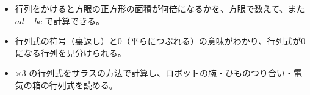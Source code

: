 \newcommand\kviiecols[4]{%
  \draw[bkRed, line width=1.3pt, -{Stealth[length=2.4mm]}] (0,0) -- (#1,#3);
  \draw[bkGreen!60!black, line width=1.3pt, -{Stealth[length=2.4mm]}] (0,0) -- (#2,#4);}
\newcommand\kviiecard[4]{\begin{scope}[shift={#1}]
  \foreach \kviiei/\kviiej in {#3} {\fill[#2!35] ({(\kviiej-1)*4.2},{-(\kviiei-1)*4.2}) rectangle ++(4.2,-4.2);}
  \draw[bkInk!60, line width=0.4pt, step=4.2] (0,{-#4*4.2}) grid ({#4*4.2},0);
  \draw[bkInk, line width=0.8pt] (0,{-#4*4.2}) rectangle ({#4*4.2},0);
\end{scope}}
\newcommand\kviiebx[3]{\node[bk node, draw=bkInk!70, fill=bkPaper, minimum width=26mm, minimum height=13mm, align=center, font=\footnotesize] (#2) at #1 {#3};}
\makeatother


\begin{goal}
\begin{itemize}[label={\color{\bkTT}●}, leftmargin=1.6\zw, itemsep=0pt, topsep=1pt]
\item {}\enspace 行列をかけると方眼の正方形の面積が何倍になるかを、方眼で数えて、また $ad-bc$ で計算できる。
\item {}\enspace 行列式の符号（裏返し）と0（平らにつぶれる）の意味がわかり、行列式が0になる行列を見分けられる。
\item {}×3 の行列式をサラスの方法で計算し、ロボットの腕・ひものつり合い・電気の箱の行列式を読める。
\end{itemize}
\end{goal}

